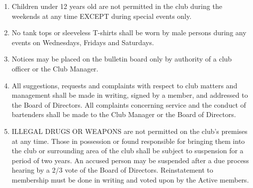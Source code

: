 \documentclass[12pt,letterpaper]{article}
\begin{document}
\begin{enumerate}
\item Children under 12 years old are not permitted in the club during the weekends
at any time EXCEPT during special events only.

\item No tank tops or sleeveless T-shirts shall be worn by male persons during any
events on Wednesdays, Fridays and Saturdays.

\item Notices may be placed on the bulletin board only by authority of a club officer
or the Club Manager.

\item All suggestions, requests and complaints with respect to club matters and
management shall be made in writing, signed by a member, and addressed to
the Board of Directors. All complaints concerning service and the conduct of
bartenders shall be made to the Club Manager or the Board of Directors.

\item ILLEGAL DRUGS OR WEAPONS are not permitted on the club’s premises at
any time. Those in possession or found responsible for bringing them into the
club or surrounding area of the club shall be subject to suspension for a period
of two years. An accused person may be suspended after a due process hearing
by a 2/3 vote of the Board of Directors. Reinstatement to membership must be
done in writing and voted upon by the Active members.

\end{enumerate}
\end{document}
